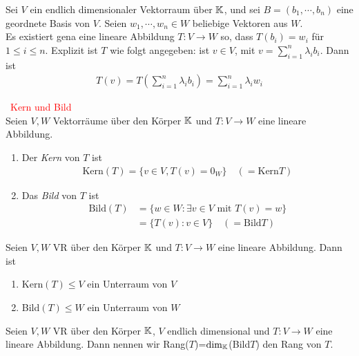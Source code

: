\begin{theorem}
Sei $V$ ein endlich dimensionaler Vektorraum über $\mathbb{K}$, und sei $B=(b_1,\dotsb,b_n)$ eine geordnete Basis von $V$. Seien $w_1,\dotsb,w_n\in W$ beliebige Vektoren aus $W$.\\
Es existiert gena eine lineare Abbildung $T:V\to W$ so, dass $T(b_i)=w_i$ für $1\leq i\leq n$. Explizit ist $T$ wie folgt angegeben: ist $v\in V$, mit $v=\sum_{i=1}^n\lambda_i b_i$. Dann ist 
\begin{align*}
    T(v)=T\left(\sum_{i=1}^n\lambda_i b_i\right) = \sum_{i=1}^n\lambda_i w_i
\end{align*}
\end{theorem}

\begin{definition}\,
\textcolor{red}{Kern und Bild}\\
Seien $V,W$ Vektorräume über den Körper $\mathbb{K}$ und $T:V\to W$ eine lineare Abbildung.
\begin{enumerate}[1.]
    \item Der \textit{Kern} von $T$ ist
    \begin{align*}
        \text{Kern}(T)=\{v\in V, T(v)=0_W\} \quad (=\text{Kern}T)
    \end{align*}
    \item Das \textit{Bild} von $T$ ist 
    \begin{align*}
        \text{Bild}(T)&=\{w\in W:\exists v\in V \text{ mit } T(v)=w\}\\
        &=\{T(v):v\in V\} \quad (=\text{Bild}T)
    \end{align*}
\end{enumerate}
\end{definition}

\begin{theorem}
Seien $V,W$ VR über den Körper $\mathbb{K}$ und $T:V\to W$ eine lineare Abbildung. Dann ist 
\begin{enumerate}
    \item Kern$(T)\leq V$ ein Unterraum von $V$
    \item Bild$(T)\leq W$ ein Unterraum von $W$
\end{enumerate}
\end{theorem}

\begin{definition}
Seien $V,W$ VR über den Körper $\mathbb{K}$, $V$ endlich dimensional und $T:V\to W$ eine lineare Abbildung. Dann nennen wir Rang($T$)=$\text{dim}_{\mathbb{K}}$(Bild$T$) den Rang von $T$.
\end{definition}

